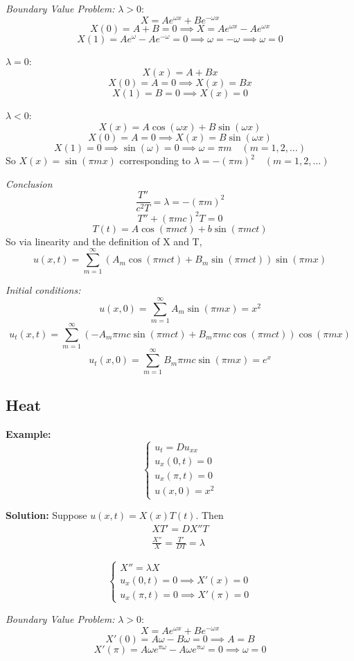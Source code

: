 \documentclass[12pt]{article}
\begin{document}
\emph{Boundary Value Problem:}
$\lambda > 0$:
\[X = Ae^{\omega x} + Be^{-\omega x}\]
\[X(0) = A + B = 0 \implies X = Ae^{\omega x} - Ae^{\omega x}\]
\[X(1) = Ae^{\omega} - Ae^{-\omega} = 0 \implies \omega = -\omega \implies \omega = 0\]

$\lambda = 0$:
\[X(x) = A + Bx\]
\[X(0) = A = 0 \implies X(x) = Bx\]
\[X(1) = B = 0 \implies X(x) = 0\]

$\lambda <0$:
\[X(x) = A\cos(\omega x) + B\sin(\omega x)\]
\[X(0) = A = 0 \implies X(x) = B\sin(\omega x)\]
\[X(1) = 0 \implies \sin(\omega) = 0 \implies \omega = \pi m \quad (m = 1, 2, ...)\]
So $X(x) = \sin(\pi mx)$ corresponding to $\lambda = -(\pi m)^2 \quad (m =1, 2, ...)$

\emph{Conclusion}
\[\frac{T''}{c^2T} = \lambda = -(\pi m)^2\]
\[T'' + (\pi m c)^2 T = 0\]
\[T(t) = A\cos(\pi mct) + b\sin(\pi mct)\]
So via linearity and the definition of X and T, 
\[u(x, t) = \sum_{m=1}^\infty (A_m\cos(\pi mct) + B_m\sin(\pi mct))\sin(\pi mx)\]

\emph{Initial conditions:}
\[u(x, 0) = \boxed{\sum_{m=1}^\infty A_m\sin(\pi mx) = x^2}\]
\[u_t(x, t) = \sum_{m=1}^\infty (-A_m\pi mc \sin(\pi mct) + B_m \pi mc \cos(\pi mct))\cos(\pi mx)\]
\[u_t(x, 0) = \boxed{\sum_{m=1}^\infty B_m\pi mc \sin(\pi mx) = e^x}\]

\subsection{Heat}
\textbf{Example:}
\[\begin{cases}
    u_t = Du_{xx}\\
    u_x(0, t) = 0\\
    u_x(\pi, t) = 0\\
    u(x, 0) = x^2
\end{cases}\]

\textbf{Solution:}
Suppose $u(x, t) = X(x) T(t)$. Then 
\begin{gather*}
    XT' = DX''T\\
    \frac{X''}{X} = \frac{T'}{DT} = \lambda
\end{gather*}

\[\begin{cases*}
    X'' = \lambda X\\
    u_x(0, t) = 0\implies X'(x) = 0\\
    u_x(\pi, t) = 0 \implies X'(\pi) = 0
\end{cases*}\]

\emph{Boundary Value Problem:}
$\lambda > 0$: 
\[X = Ae^{\omega x} + Be^{-\omega x}\]
\[X'(0) = A\omega - B\omega = 0 \implies A = B\]
\[X'(\pi) = A\omega e^{\pi \omega} - A\omega e^{\pi \omega} = 0 \implies \omega = 0\]
\end{document}
